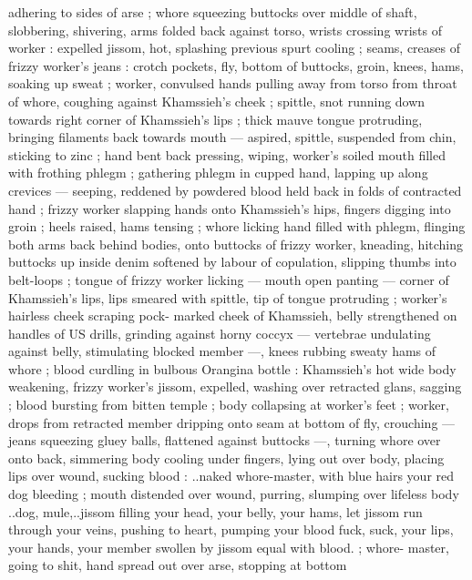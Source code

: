 adhering to sides of arse ; whore squeezing buttocks over middle of 
shaft, slobbering, shivering, arms folded back against torso, wrists 
crossing wrists of worker : expelled jissom, hot, splashing previous 
spurt cooling ; seams, creases of frizzy worker's jeans : crotch 
pockets, fly, bottom of buttocks, groin, knees, hams, soaking up 
sweat ; worker, convulsed hands pulling away from torso from throat 
of whore, coughing against Khamssieh's cheek ; spittle, snot 
running down towards right corner of Khamssieh's lips ; thick mauve 
tongue protruding, bringing filaments back towards mouth --- 
aspired, spittle, suspended from chin, sticking to zinc ; hand bent 
back pressing, wiping, worker's soiled mouth filled with frothing 
phlegm ; gathering phlegm in cupped hand, lapping up along 
crevices --- seeping, reddened by powdered blood held back in folds 
of contracted hand ; frizzy worker slapping hands onto Khamssieh's 
hips, fingers digging into groin ; heels raised, hams tensing ; whore 
licking hand filled with phlegm, flinging both arms back behind 
bodies, onto buttocks of frizzy worker, kneading, hitching buttocks 
up inside denim softened by labour of copulation, slipping thumbs 
into belt-loops ; tongue of frizzy worker licking --- mouth open 
panting --- corner of Khamssieh's lips, lips smeared with spittle, tip 
of tongue protruding ; worker's hairless cheek scraping pock- 
marked cheek of Khamssieh, belly strengthened on handles of US 
drills, grinding against horny coccyx --- vertebrae undulating against 
belly, stimulating blocked member ---, knees rubbing sweaty hams of 
whore ; blood curdling in bulbous Orangina bottle : Khamssieh's hot 
wide body weakening, frizzy worker's jissom, expelled, washing over 
retracted glans, sagging ; blood bursting from bitten temple ; body 
collapsing at worker's feet ; worker, drops from retracted member 
dripping onto seam at bottom of fly, crouching --- jeans squeezing 
gluey balls, flattened against buttocks ---, turning whore over onto 
back, simmering body cooling under fingers, lying out over body, 
placing lips over wound, sucking blood : {\gl}..naked whore-master, with 
blue hairs{\thd} your red dog bleeding{\thd}{\gr} ; mouth distended over wound, 
purring, slumping over lifeless body{\td} {\gl}..dog, mule,..jissom filling 
your head, your belly, your hams, let jissom run through your veins, 
pushing to heart, pumping your blood{\td} fuck, suck, your lips, your 
hands, your member swollen by jissom equal with blood.{\gr} ; whore- 
master, going to shit, hand spread out over arse, stopping at bottom 
